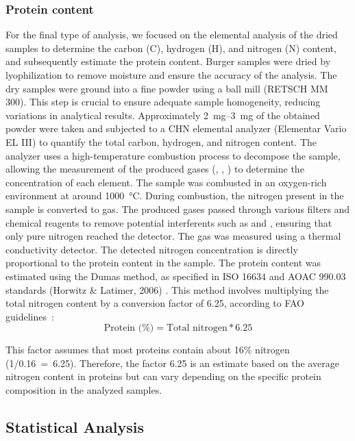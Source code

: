 \subsubsection{Protein content}
For the final type of analysis, we focused on the elemental analysis of the dried samples to determine the carbon (C), hydrogen (H), and nitrogen (N) content, and subsequently estimate the protein content.
Burger samples were dried by lyophilization to remove moisture and ensure the accuracy of the analysis. The dry samples were ground into a fine powder using a ball mill (RETSCH MM 300). This step is crucial to ensure adequate sample homogeneity, reducing variations in analytical results. Approximately \qtyrange{2}{3}{\milli\gram} of the obtained powder were taken and subjected to a CHN elemental analyzer (Elementar Vario EL III) to quantify the total carbon, hydrogen, and nitrogen content. The analyzer uses a high-temperature combustion process to decompose the sample, allowing the measurement of the produced gases (, , ) to determine the concentration of each element.
The sample was combusted in an oxygen-rich environment at around \qty{1000}{\degreeCelsius}. During combustion, the nitrogen present in the sample is converted to  gas. The produced gases passed through various filters and chemical reagents to remove potential interferents such as  and , ensuring that only pure nitrogen reached the detector. The  gas was measured using a thermal conductivity detector. The detected nitrogen concentration is directly proportional to the protein content in the sample.
The protein content was estimated using the Dumas method, as specified in
\zxriv{}ISO 16634 and AOAC 990.03 standards (Horwitz \& Latimer, 2006)\zxriv{}
. This method involves multiplying the total nitrogen content by a conversion factor of \num{6.25}, according to FAO guidelines~\parencite{fao_2003}:
\[
    \text{Protein (\%)} = \text{Total nitrogen} * 6.25
\]

This factor assumes that most proteins contain about \num{16}\% nitrogen \mbox{(1/0.16 = 6.25)}. Therefore, the factor 6.25 is an estimate based on the average nitrogen content in proteins but can vary depending on the specific protein composition in the analyzed samples.

\subsection{Statistical Analysis}
